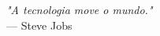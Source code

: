 \begin{epigrafe}
\vspace*{\fill}
\begin{flushright}
\emph{"A tecnologia move o mundo."} \\
\vspace{0.5cm}
— Steve Jobs
\end{flushright}
\end{epigrafe}
